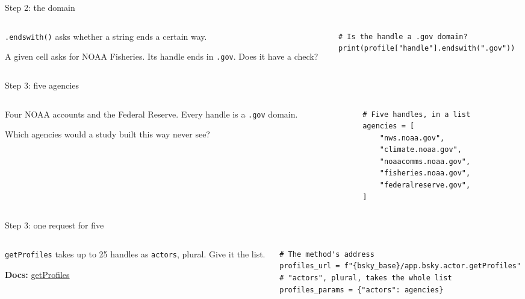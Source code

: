 \documentclass[9pt,aspectratio=169]{beamer}
\begin{document}
\begin{frame}[fragile]{Step 2: the domain}
    \begin{columns}[T]
        \begin{column}{0.37\textwidth}
            \texttt{.endswith()} asks whether a string ends a certain way.

            \medskip
            A given cell asks for NOAA Fisheries. Its handle ends in \texttt{.gov}. Does it have a check?
        \end{column}
        \begin{column}{0.6\textwidth}
\begin{lstlisting}
# Is the handle a .gov domain?
print(profile["handle"].endswith(".gov"))
\end{lstlisting}
        \end{column}
    \end{columns}
\end{frame}

\begin{frame}[fragile]{Step 3: five agencies}
    \begin{columns}[T]
        \begin{column}{0.37\textwidth}
            Four NOAA accounts and the Federal Reserve. Every handle is a \texttt{.gov} domain.

            \medskip
            Which agencies would a study built this way never see?
        \end{column}
        \begin{column}{0.6\textwidth}
\begin{lstlisting}
# Five handles, in a list
agencies = [
    "nws.noaa.gov",
    "climate.noaa.gov",
    "noaacomms.noaa.gov",
    "fisheries.noaa.gov",
    "federalreserve.gov",
]
\end{lstlisting}
        \end{column}
    \end{columns}
\end{frame}

\begin{frame}[fragile]{Step 3: one request for five}
    \begin{columns}[T]
        \begin{column}{0.37\textwidth}
            \texttt{getProfiles} takes up to 25 handles as \texttt{actors}, plural. Give it the list.

            \medskip
            {\scriptsize\textbf{Docs:} \href{https://endpoints.bsky.app/\#bluesky-app/tag/appbskyactor/GET/xrpc/app.bsky.actor.getProfiles}{getProfiles}\par}
        \end{column}
        \begin{column}{0.6\textwidth}
\begin{lstlisting}
# The method's address
profiles_url = f"{bsky_base}/app.bsky.actor.getProfiles"
# "actors", plural, takes the whole list
profiles_params = {"actors": agencies}
\end{lstlisting}
        \end{column}
    \end{columns}
\end{frame}
\end{document}
